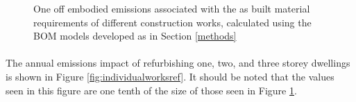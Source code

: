 \documentclass[12pt]{article}
\begin{document}
\begin{figure}[!ht]
{        }   
    \caption[]{One off embodied emissions associated with the as built material requirements of different construction works, calculated using the BOM models developed as in Section \ref{methods}}
    \label{fig:individualworksnew}
\end{figure}
\clearpage

\paragraph{}
The annual emissions impact of refurbishing one, two, and three storey dwellings is shown in Figure \ref{fig:individualworksref}. It should be noted that the values seen in this figure are one tenth of the size of those seen in Figure \ref{fig:individualworksnew}.
\end{document}
